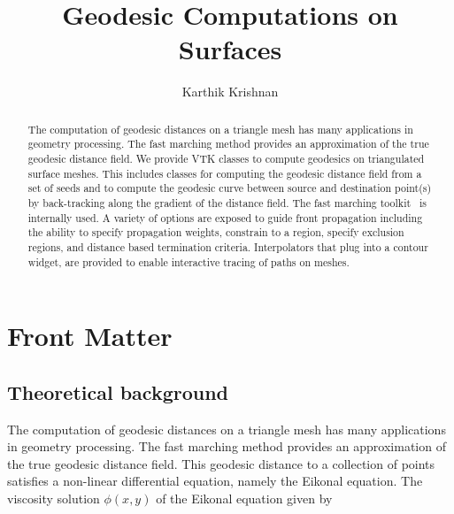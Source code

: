 \documentclass{InsightArticle}
\title{Geodesic Computations on Surfaces}
\author{Karthik Krishnan}
\newcommand{\IJhandlerIDnumber}{3415}
\begin{document}
%
% 
\IJhandlefooter{\IJhandlerIDnumber}


\ifpdf
\else
\fi


\maketitle


\ifhtml
\chapter*{Front Matter\label{front}}
\fi


\begin{abstract}
\noindent

The computation of geodesic distances on a triangle mesh has many applications in geometry processing. The fast marching method provides an approximation of the true geodesic distance field. We provide VTK classes to compute geodesics on triangulated surface meshes. This includes classes for computing the geodesic distance field from a set of seeds and to compute the geodesic curve between source and destination point(s) by back-tracking along the gradient of the distance field. The fast marching toolkit~\cite{Peyre06} is internally used. A variety of options are exposed to guide front propagation including the ability to specify propagation weights, constrain to a region, specify exclusion regions, and distance based termination criteria. Interpolators that plug into a contour widget, are provided to enable interactive tracing of paths on meshes.
%
\end{abstract}

\IJhandlenote{\IJhandlerIDnumber}

\tableofcontents

%
\section{Theoretical background}
The computation of geodesic distances on a triangle mesh has many applications in geometry processing.
The fast marching method provides an approximation of the true geodesic distance field.
This geodesic distance to a collection of points satisfies a non-linear differential equation, namely the Eikonal equation. The viscosity solution $\phi(x,y)$ of the Eikonal equation given by
\end{document}
